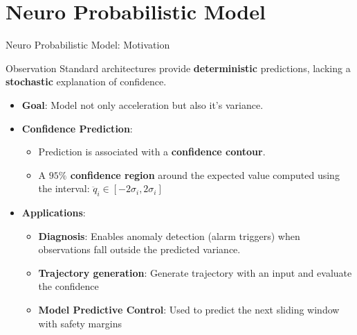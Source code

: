 \section{Neuro Probabilistic Model}

\begin{frame}{Neuro Probabilistic Model: Motivation}
    \begin{block}{Observation}
        Standard architectures provide \textbf{deterministic} predictions, lacking a \textbf{stochastic} explanation of confidence.
    \end{block}

    \begin{itemize}
        \item \textbf{Goal}: Model not only acceleration but also it's variance. 
        \item \textbf{Confidence Prediction}:
        \begin{itemize}
            \item Prediction is associated with a \textbf{confidence contour}.
            \item A \textbf{$95\%$ confidence region} around the expected value computed using the interval: $\ddot{q}_i \in [-2\sigma_i, 2\sigma_i]$
        \end{itemize}
        \item \textbf{Applications}: 
        \begin{itemize}
            \item \textbf{Diagnosis}: Enables anomaly detection (alarm triggers) when observations fall outside the predicted variance.
            \item \textbf{Trajectory generation}: Generate trajectory with an input and evaluate the confidence
            \item \textbf{Model Predictive Control}: Used to predict the next sliding window with safety margins
        \end{itemize}
        
    \end{itemize}
\end{frame}


